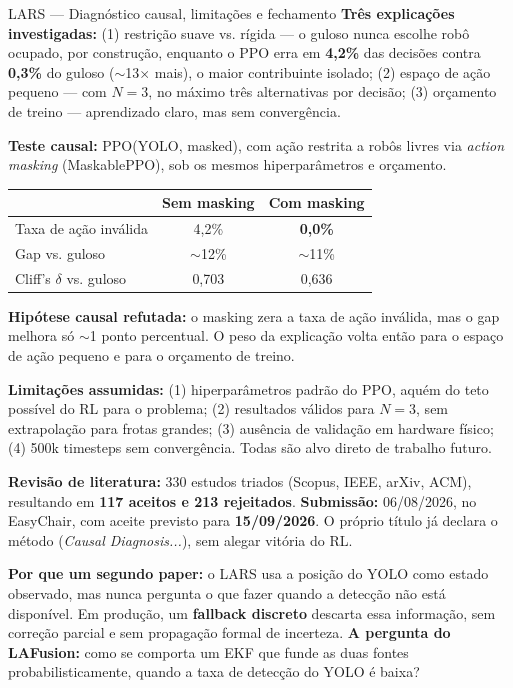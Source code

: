 \documentclass[aspectratio=169]{beamer}
\begin{document}
\begin{frame}{LARS — Diagnóstico causal, limitações e fechamento}
\tiny
\textbf{Três explicações investigadas:} (1) restrição suave vs. rígida — o guloso nunca escolhe robô ocupado, por construção, enquanto o PPO erra em \textbf{4,2\%} das decisões contra \textbf{0,3\%} do guloso ($\sim$13$\times$ mais), o maior contribuinte isolado; (2) espaço de ação pequeno — com $N=3$, no máximo três alternativas por decisão; (3) orçamento de treino — aprendizado claro, mas sem convergência.

\vspace{0.15cm}
\textbf{Teste causal:} PPO(YOLO, masked), com ação restrita a robôs livres via \emph{action masking} (MaskablePPO), sob os mesmos hiperparâmetros e orçamento.
\begin{center}
\begin{tabular}{lcc}
\toprule
 & \textbf{Sem masking} & \textbf{Com masking} \\
\midrule
Taxa de ação inválida & 4,2\% & \textbf{0,0\%} \\
Gap vs. guloso & $\sim$12\% & $\sim$11\% \\
Cliff's $\delta$ vs. guloso & 0,703 & 0,636 \\
\bottomrule
\end{tabular}
\end{center}
\textbf{Hipótese causal refutada:} o masking zera a taxa de ação inválida, mas o gap melhora só $\sim$1 ponto percentual. O peso da explicação volta então para o espaço de ação pequeno e para o orçamento de treino.

\vspace{0.15cm}
\textbf{Limitações assumidas:} (1) hiperparâmetros padrão do PPO, aquém do teto possível do RL para o problema; (2) resultados válidos para $N=3$, sem extrapolação para frotas grandes; (3) ausência de validação em hardware físico; (4) 500k timesteps sem convergência. Todas são alvo direto de trabalho futuro.

\textbf{Revisão de literatura:} 330 estudos triados (Scopus, IEEE, arXiv, ACM), resultando em \textbf{117 aceitos e 213 rejeitados}. \textbf{Submissão:} 06/08/2026, no EasyChair, com aceite previsto para \textbf{15/09/2026}. O próprio título já declara o método (\emph{Causal Diagnosis...}), sem alegar vitória do RL.

\vspace{0.1cm}
\textbf{Por que um segundo paper:} o LARS usa a posição do YOLO como estado observado, mas nunca pergunta o que fazer quando a detecção não está disponível. Em produção, um \textbf{fallback discreto} descarta essa informação, sem correção parcial e sem propagação formal de incerteza. \textbf{A pergunta do LAFusion:} como se comporta um EKF que funde as duas fontes probabilisticamente, quando a taxa de detecção do YOLO é baixa?
\end{frame}
\end{document}
